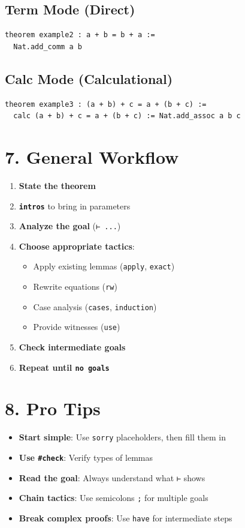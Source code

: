\documentclass{amsart}
\theoremstyle{plain}
\theoremstyle{definition}
\theoremstyle{remark}
\begin{document}
\subsection{\textbf{Term Mode} (Direct)}

\begin{lstlisting}[language=lean]
theorem example2 : a + b = b + a := 
  Nat.add_comm a b
\end{lstlisting}
\subsection{\textbf{Calc Mode} (Calculational)}

\begin{lstlisting}[language=lean]
theorem example3 : (a + b) + c = a + (b + c) := 
  calc (a + b) + c = a + (b + c) := Nat.add_assoc a b c
\end{lstlisting}

\section{\textbf{7. General Workflow}}

\begin{enumerate}
	\item \textbf{State the theorem}
	\item \textbf{\lstinline{intros}} to bring in parameters
	\item \textbf{Analyze the goal} (\lstinline{⊢ ...})
	\item \textbf{Choose appropriate tactics}:
	\begin{itemize}
		\item Apply existing lemmas (\lstinline{apply}, \lstinline{exact})
		\item Rewrite equations (\lstinline{rw})
		\item Case analysis (\lstinline{cases}, \lstinline{induction})
		\item Provide witnesses (\lstinline{use})
	\end{itemize}
	\item \textbf{Check intermediate goals}
	\item \textbf{Repeat until \lstinline{no goals}}
\end{enumerate}


\section{\textbf{8. Pro Tips}}

\begin{itemize}
	\item \textbf{Start simple}: Use \lstinline{sorry} placeholders, then fill them in
	\item \textbf{Use \lstinline{#check}}: Verify types of lemmas
	\item \textbf{Read the goal}: Always understand what \lstinline{⊢} shows
	\item \textbf{Chain tactics}: Use semicolons \lstinline{;} for multiple goals
	\item \textbf{Break complex proofs}: Use \lstinline{have} for intermediate steps
\end{itemize}
\end{document}
